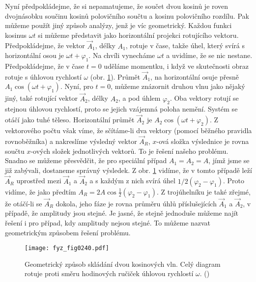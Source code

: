     Nyní předpokládejme, že si nepamatujeme, že součet dvou kosinů je roven dvojnásobku součinu 
    kosinů polovičního součtu a kosinu polovičního rozdílu. Pak můžeme použít jiný způsob analýzy, 
    jenž je víc geometrický. Každou funkci kosinus \(\omega t\) si můžeme představit jako 
    horizontální projekci rotujícího vektoru. Předpokládejme, že vektor \(\vec{A}_1\), délky 
    \(A_1\), rotuje v čase, takže úhel, který svírá s horizontální osou je \(\omega t + 
    \varphi_1\). Na chvíli vynecháme \(\omega t\) a uvidíme, že se nic nestane. Předpokládejme, že 
    v čase \(t=0\) uděláme momentku, i když ve skutečnosti obraz rotuje s úhlovou rychlostí 
    \(\omega\) (obr. \ref{fyz:fig0240}). Průmět \(\vec{A}_1\), na horizontální osuje přesně 
    \(A_1\cos(\omega t + \varphi_1)\). Nyní, pro \(t = 0\), můžeme znázornit druhou vlnu jako 
    nějaký jiný, také rotující vektor \(\vec{A}_2\), délky \(A_2\), a pod úhlem \(\varphi_2\). Oba 
    vektory rotují se stejnou úhlovou rychlostí, proto se jejich vzájemná poloha nemění. Systém se 
    otáčí jako tuhé těleso. Horizontální průmět \(\vec{A}_2\) je \(A_2\cos(\omega t + \varphi_2)\). 
    Z vektorového počtu však víme, že sčítáme-li dva vektory (pomocí běžného pravidla rovnoběžníka) 
    a nakreslíme výsledný vektor \(\vec{A}_R\), \(x\)-ová složka výslednice je rovna součtu 
    \(x\)-ových složek jednotlivých vektorů. To je řešení našeho problému. Snadno se můžeme 
    přesvědčit, že pro speciální případ \(A_1 = A_2 = A\), jímž jsme se již zabývali, dostaneme 
    správný výsledek. Z obr. \ref{fyz:fig0240} vidíme, že v tomto případě leží \(\vec{A}_R\) 
    uprostřed mezi \(\vec{A}_1\) a \(\vec{A}_2\) a s každým z nich svírá úhel \(1/2(\varphi_2 - 
    \varphi_1)\). Proto vidíme, že jako předtím \(A_R = 2A\cos\frac{1}{2}(\varphi_2 - \varphi_1)\). 
    Z trojúhelníku je také zřejmé, že otáčí-li se \(\vec{A}_R\) dokola, jeho fáze je rovna průměru 
    úhlů příslušejících \(\vec{A}_1\) a \(\vec{A}_2\), v případě, že amplitudy jsou stejné. Je
    jasné, že stejně jednoduše můžeme najít řešení i pro případ, kdy amplitudy nejsou stejné. To 
    můžeme nazvat geometrickým způsobem řešení problému.
    
    \begin{figure}[ht!] %
      \centering
      \texttt{[image: fyz\_fig0240.pdf]}
      \caption{Geometrický způsob skládání dvou kosinových vln. Celý diagram rotuje proti směru 
               hodinových ručiček úhlovou rychlostí \(\omega\).
               (\cite[s.~387]{Feynman01})}
      \label{fyz:fig0240}
    \end{figure}
    
